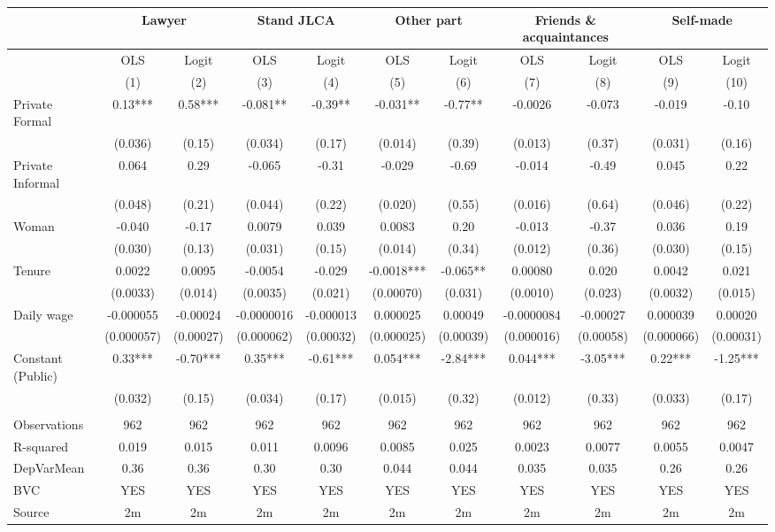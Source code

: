 \begin{tabular}{lcccccccccc}
\toprule
      & \multicolumn{2}{c}{Lawyer} & \multicolumn{2}{c}{Stand JLCA} & \multicolumn{2}{c}{Other part} & \multicolumn{2}{c}{Friends \& acquaintances} & \multicolumn{2}{c}{Self-made} \\
\midrule
\midrule
      & OLS   & Logit & OLS   & Logit & OLS   & Logit & OLS   & Logit & OLS   & Logit \\
\midrule
      & (1)   & (2)   & (3)   & (4)   & (5)   & (6)   & (7)   & (8)   & (9)   & (10) \\
\midrule
\midrule
Private Formal & 0.13*** & 0.58*** & -0.081** & -0.39** & -0.031** & -0.77** & -0.0026 & -0.073 & -0.019 & -0.10 \\
      & (0.036) & (0.15) & (0.034) & (0.17) & (0.014) & (0.39) & (0.013) & (0.37) & (0.031) & (0.16) \\
Private Informal & 0.064 & 0.29  & -0.065 & -0.31 & -0.029 & -0.69 & -0.014 & -0.49 & 0.045 & 0.22 \\
      & (0.048) & (0.21) & (0.044) & (0.22) & (0.020) & (0.55) & (0.016) & (0.64) & (0.046) & (0.22) \\
Woman & -0.040 & -0.17 & 0.0079 & 0.039 & 0.0083 & 0.20  & -0.013 & -0.37 & 0.036 & 0.19 \\
      & (0.030) & (0.13) & (0.031) & (0.15) & (0.014) & (0.34) & (0.012) & (0.36) & (0.030) & (0.15) \\
Tenure & 0.0022 & 0.0095 & -0.0054 & -0.029 & -0.0018*** & -0.065** & 0.00080 & 0.020 & 0.0042 & 0.021 \\
      & (0.0033) & (0.014) & (0.0035) & (0.021) & (0.00070) & (0.031) & (0.0010) & (0.023) & (0.0032) & (0.015) \\
Daily wage & -0.000055 & -0.00024 & -0.0000016 & -0.000013 & 0.000025 & 0.00049 & -0.0000084 & -0.00027 & 0.000039 & 0.00020 \\
      & (0.000057) & (0.00027) & (0.000062) & (0.00032) & (0.000025) & (0.00039) & (0.000016) & (0.00058) & (0.000066) & (0.00031) \\
Constant (Public) & 0.33*** & -0.70*** & 0.35*** & -0.61*** & 0.054*** & -2.84*** & 0.044*** & -3.05*** & 0.22*** & -1.25*** \\
      & (0.032) & (0.15) & (0.034) & (0.17) & (0.015) & (0.32) & (0.012) & (0.33) & (0.033) & (0.17) \\
      &       &       &       &       &       &       &       &       &       &  \\
\midrule
Observations  & 962   & 962   & 962   & 962   & 962   & 962   & 962   & 962   & 962   & 962 \\
R-squared & 0.019 & 0.015 & 0.011 & 0.0096 & 0.0085 & 0.025 & 0.0023 & 0.0077 & 0.0055 & 0.0047 \\
DepVarMean & 0.36  & 0.36  & 0.30  & 0.30  & 0.044 & 0.044 & 0.035 & 0.035 & 0.26  & 0.26 \\
BVC   & YES   & YES   & YES   & YES   & YES   & YES   & YES   & YES   & YES   & YES \\
Source & 2m    & 2m    & 2m    & 2m    & 2m    & 2m    & 2m    & 2m    & 2m    & 2m \\
\bottomrule
\bottomrule
\end{tabular}%
